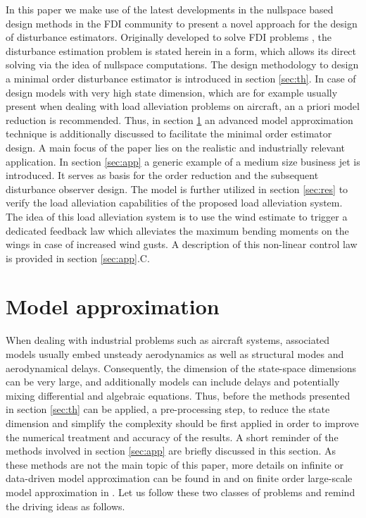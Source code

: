 \documentclass[graybox]{svmult}
\begin{document}
In this paper we make use of the latest developments in the nullspace based design methods in the FDI community to present a novel approach for the design of disturbance estimators.
Originally developed to solve FDI problems \cite{frisk_01, Varga17}, the disturbance estimation problem is stated herein in a form, which allows its direct solving  via the idea of nullspace computations.
The design methodology  to design a minimal order disturbance estimator is introduced in section \ref{sec:th}. 
In case of design models with very high state dimension, which are for example usually present when dealing with load alleviation problems on aircraft, an a priori model reduction is recommended. Thus, in section \ref{sec:mr} an advanced model approximation technique is additionally discussed to facilitate the minimal order estimator design.
A main focus of the paper lies on the realistic and  industrially relevant  application. In section \ref{sec:app} a generic example of a medium size business jet is introduced. It serves as basis for the order reduction and the subsequent disturbance observer design. The model is further utilized in section \ref{sec:res} to verify the load alleviation capabilities  of the proposed load alleviation system.
The idea of this load alleviation system is to use the wind estimate to trigger a dedicated feedback law which alleviates the maximum bending moments on the wings in case of increased wind gusts. A description of this non-linear control law is provided in section \ref{sec:app}.C.


\section{Model approximation}\label{sec:mr}

When dealing with industrial problems such as aircraft systems, associated models usually embed unsteady aerodynamics as well as structural modes and aerodynamical delays. Consequently, the dimension of the  state-space dimensions can be very large, and additionally models can include delays and potentially mixing differential and algebraic equations. Thus, before the methods presented in section \ref{sec:th} can be applied, a pre-processing step, to reduce the state dimension and simplify the complexity should be first applied in order to improve the numerical treatment and accuracy of the results. A short reminder of the methods involved in section \ref{sec:app} are briefly discussed in this section. As these methods are not the main topic of this paper, more details on infinite or data-driven model approximation can be found in \cite{AntoulasSurvey:2016,DalmasECC:2016,Meyer:2016} and on finite order large-scale model approximation in \cite{AntoulasBook:2005,GugercinSIAM:2008}.  Let us follow these two classes of problems and remind the driving ideas as follows.
\end{document}

